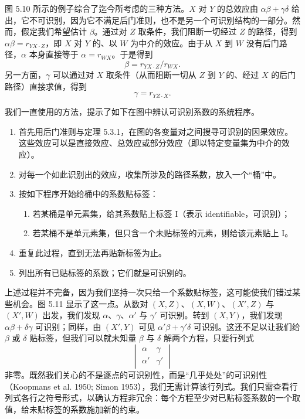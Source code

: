 图 5.10 所示的例子综合了迄今所考虑的三种方法。$X$ 对 $Y$ 的总效应由 $\alpha\beta+\gamma\delta$ 给出，它不可识别，因为它不满足后门准则，也不是另一个可识别结构的一部分。然而，假定我们希望估计 $\beta$。通过对 $Z$ 取条件，我们阻断一切经过 $Z$ 的路径，得到 $\alpha\beta=r_{YX\cdot Z}$，即 $X$ 对 $Y$ 的、以 $W$ 为中介的效应。由于从 $X$ 到 $W$ 没有后门路径，$\alpha$ 本身直接等于 $\alpha=r_{WX}$。于是得到
\[
\beta=r_{YX\cdot Z}/r_{WX}.
\]
另一方面，$\gamma$ 可以通过对 $X$ 取条件（从而阻断一切从 $Z$ 到 $Y$ 的、经过 $X$ 的后门路径）直接求值，得到
\[
\gamma=r_{YZ\cdot X}.
\]

我们一直使用的方法，提示了如下在图中辨认可识别系数的系统程序。

\begin{enumerate}[label=\arabic*.,leftmargin=1.8em]
\item 首先用后门准则与定理 5.3.1，在图的各变量对之间搜寻可识别的因果效应。这些效应可以是直接效应、总效应或部分效应（即以特定变量集为中介的效应）。
\item 对每一个如此识别出的效应，收集所涉及的路径系数，放入一个“桶”中。
\item 按如下程序开始给桶中的系数贴标签：
\begin{enumerate}[label=(\alph*),leftmargin=2.0em]
\item 若某桶是单元素集，给其系数贴上标签 I（表示 identifiable，可识别）；
\item 若某桶不是单元素集，但只含一个未贴标签的元素，则给该元素贴上 I。
\end{enumerate}
\item 重复此过程，直到无法再贴新标签为止。
\item 列出所有已贴标签的系数；它们就是可识别的。
\end{enumerate}

上述过程并不完备，因为我们坚持一次只给一个系数贴标签，这可能使我们错过某些机会。图 5.11 显示了这一点。从数对 $(X,Z)$、$(X,W)$、$(X',Z)$ 与 $(X',W)$ 出发，我们发现 $\alpha$、$\gamma$、$\alpha'$ 与 $\gamma'$ 可识别。转到 $(X,Y)$，我们发现 $\alpha\beta+\delta\gamma$ 可识别；同样，由 $(X',Y)$ 可见 $\alpha'\beta+\gamma'\delta$ 可识别。这还不足以让我们给 $\beta$ 或 $\delta$ 贴标签，但我们可以就未知量 $\beta$ 与 $\delta$ 解两个方程，只要行列式
\[
\begin{vmatrix}\alpha & \gamma\\ \alpha' & \gamma'\end{vmatrix}
\]
非零。既然我们关心的不是逐点的可识别性，而是“几乎处处”的可识别性（Koopmans et al. 1950; Simon 1953），我们无需计算该行列式。我们只需查看行列式各行之符号形式，以确认方程非冗余：每个方程至少对已贴标签系数的一个取值，给未贴标签的系数施加新的约束。

